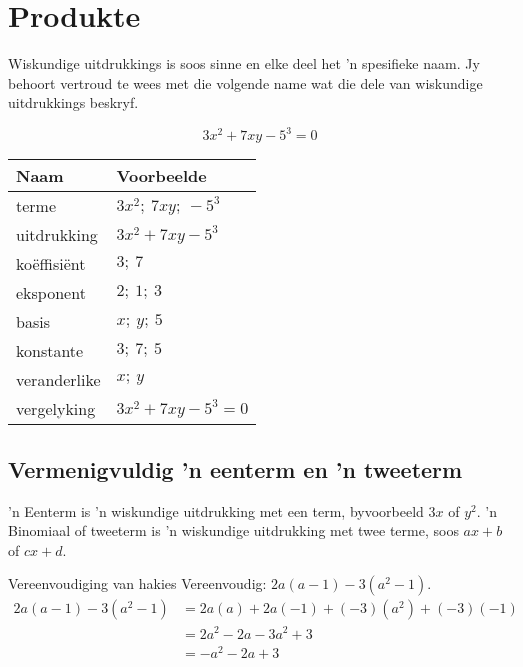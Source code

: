 \section{Produkte}
\setcounter{figure}{1}
\setcounter{subfigure}{1}

%   
\nopagebreak
Wiskundige uitdrukkings is soos sinne en elke deel het ’n spesifieke naam. Jy behoort vertroud te wees met die volgende name wat die dele van wiskundige uitdrukkings beskryf.\par 

\begin{equation*}
3x^2 + 7xy -5^3 = 0
\end{equation*}


\begin{table}[H]
\begin{center}
\begin{tabular}{|l|l|}
\hline
\textbf{Naam} & \textbf{Voorbeelde} \\
\hline
terme & $3x^2;~7xy;~-5^3$\\ \hline
uitdrukking & $3x^2 + 7xy -5^3$\\ \hline
koëffisiënt & $3;~7$\\ \hline
eksponent & $2;~1;~3$\\ \hline
basis & $x;~y;~5$\\ \hline
konstante & $3;~7;~5$\\ \hline
veranderlike & $x;~y$\\ \hline
vergelyking & $3x^2 + 7xy -5^3 = 0$\\ \hline


\end{tabular}
\end{center}
\end{table} 

\par

\subsection*{Vermenigvuldig 'n eenterm en 'n tweeterm}
’n Eenterm is ’n wiskundige uitdrukking met een term, byvoorbeeld $3x$ of $y^2$. ’n Binomiaal of tweeterm is ’n wiskundige uitdrukking met twee terme, soos $ax+b$ of $cx+d$.

\begin{wex}{Vereenvoudiging van hakies}
{Vereenvoudig: $2a(a-1) - 3(a^{2}-1)$.}
{
\begin{align*}
  2a(a-1) -3(a^{2}-1) &= 2a(a) + 2a(-1) + (-3)(a^{2})+(-3)(-1) \\
  &= 2a^{2} - 2a - 3a^{2} + 3 \\
  &= -a^{2} -2a + 3
\end{align*}
}
\end{wex}

